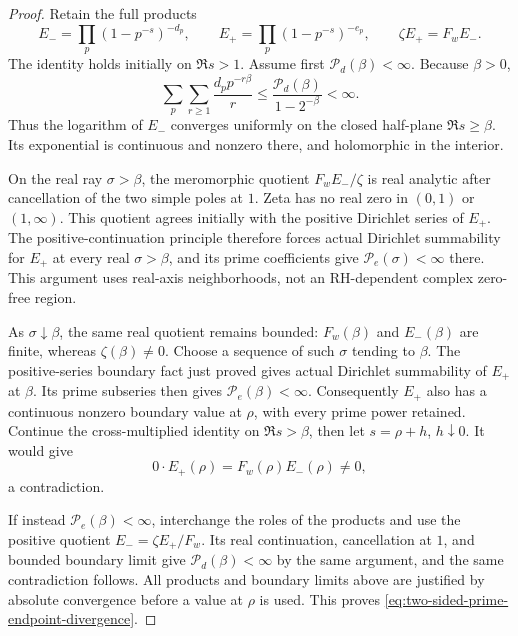 \documentclass[11pt]{article}
\theoremstyle{definition}
\begin{document}
\begin{proof}
Retain the full products
\[
 E_-=\prod_p(1-p^{-s})^{-d_p},\qquad
 E_+=\prod_p(1-p^{-s})^{-e_p},\qquad
                         \zeta E_+=F_wE_- .
\]
The identity holds initially on $\Re s>1$.
Assume first $\mathcal P_d(\beta)<\infty$.
Because $\beta>0$,
\[
 \sum_p\sum_{r\ge1}\frac{d_p p^{-r\beta}}r
       \le\frac{\mathcal P_d(\beta)}{1-2^{-\beta}}<\infty.
\]
Thus the logarithm of $E_-$ converges uniformly on the
closed half-plane $\Re s\ge\beta$. Its exponential is
continuous and nonzero there, and holomorphic in the interior.

On the real ray $\sigma>\beta$, the meromorphic quotient
$F_wE_-/\zeta$ is real analytic after cancellation of the
two simple poles at $1$.
Zeta has no real zero in $(0,1)$ or $(1,\infty)$.
This quotient agrees initially with the positive Dirichlet
series of $E_+$. The positive-continuation principle
therefore forces actual Dirichlet summability for $E_+$
at every real $\sigma>\beta$, and its prime coefficients
give $\mathcal P_e(\sigma)<\infty$ there.
This argument uses real-axis neighborhoods, not an
RH-dependent complex zero-free region.

As $\sigma\downarrow\beta$, the same real quotient remains
bounded: $F_w(\beta)$ and $E_-(\beta)$ are finite, whereas
$\zeta(\beta)\ne0$. Choose a sequence of such $\sigma$
tending to $\beta$. The positive-series boundary fact
just proved gives actual Dirichlet summability of $E_+$
at $\beta$. Its prime subseries then gives
$\mathcal P_e(\beta)<\infty$.
Consequently $E_+$ also has a continuous nonzero boundary
value at $\rho$, with every prime power retained.
Continue the cross-multiplied identity on $\Re s>\beta$,
then let $s=\rho+h$, $h\downarrow0$. It would give
\[
                 0\cdot E_+(\rho)=F_w(\rho)E_-(\rho)\ne0,
\]
a contradiction.

If instead $\mathcal P_e(\beta)<\infty$, interchange the
roles of the products and use the positive quotient
$E_-=\zeta E_+/F_w$. Its real continuation, cancellation
at $1$, and bounded boundary limit give
$\mathcal P_d(\beta)<\infty$ by the same argument,
and the same contradiction follows.
All products and boundary limits above are justified
by absolute convergence before a value at $\rho$ is used.
This proves \eqref{eq:two-sided-prime-endpoint-divergence}.
\end{proof}
\end{document}
